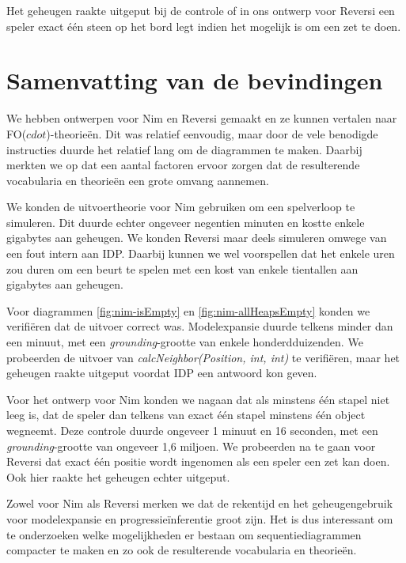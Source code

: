 Het geheugen raakte uitgeput bij de controle of in ons ontwerp voor Reversi een speler exact \'e\'en steen op het bord legt indien het mogelijk is om een zet te doen.

\section{Samenvatting van de bevindingen}
We hebben ontwerpen voor Nim en Reversi gemaakt en ze kunnen vertalen naar FO($cdot$)-theorie\"en. Dit was relatief eenvoudig, maar door de vele benodigde instructies duurde het relatief lang om de diagrammen te maken. Daarbij merkten we op dat een aantal factoren ervoor zorgen dat de resulterende vocabularia en theorie\"en een grote omvang aannemen.

We konden de uitvoertheorie voor Nim gebruiken om een spelverloop te simuleren. Dit duurde echter ongeveer negentien minuten en kostte enkele gigabytes aan geheugen. We konden Reversi maar deels simuleren omwege van een fout intern aan IDP. Daarbij kunnen we wel voorspellen dat het enkele uren zou duren om een beurt te spelen met een kost van enkele tientallen aan gigabytes aan geheugen.

Voor diagrammen \ref{fig:nim-isEmpty} en \ref{fig:nim-allHeapsEmpty} konden we verifi\"eren dat de uitvoer correct was. Modelexpansie duurde telkens minder dan een minuut, met een \textit{grounding}-grootte van enkele honderdduizenden. We probeerden de uitvoer van \textit{calcNeighbor(Position, int, int)} te verifi\"eren, maar het geheugen raakte uitgeput voordat IDP een antwoord kon geven.

Voor het ontwerp voor Nim konden we nagaan dat als minstens \'e\'en stapel niet leeg is, dat de speler dan telkens van exact \'e\'en stapel minstens \'e\'en object wegneemt. Deze controle duurde ongeveer 1 minuut en 16 seconden, met een \textit{grounding}-grootte van ongeveer 1,6 miljoen. We probeerden na te gaan voor Reversi dat exact \'e\'en positie wordt ingenomen als een speler een zet kan doen. Ook hier raakte het geheugen echter uitgeput.

Zowel voor Nim als Reversi merken we dat de rekentijd en het geheugengebruik voor modelexpansie en progressie\"inferentie groot zijn. Het is dus interessant om te onderzoeken welke mogelijkheden er bestaan om sequentiediagrammen compacter te maken en zo ook de resulterende vocabularia en theorie\"en.